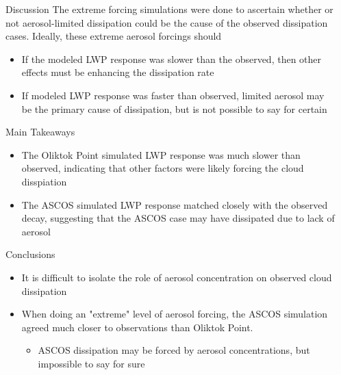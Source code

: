 \documentclass[final]{beamer}
\newlength{\sepwid}
\newlength{\onecolwid}
\begin{document}
\begin{frame}[t]
\begin{columns}[t]
\begin{column}{\sepwid}\end{column}

\begin{column}{\onecolwid}
	\begin{block}{Discussion}
		The extreme forcing simulations were done to ascertain whether or not aerosol-limited dissipation could be the cause of the observed dissipation cases. Ideally, these extreme aerosol forcings should

		\begin{itemize}
			\item If the modeled LWP response was slower than the observed, then other effects must be enhancing the dissipation rate
			\item If modeled LWP response was faster than observed, limited aerosol may be the primary cause of dissipation, but is not possible to say for certain
		\end{itemize}
		
	\end{block}
	\begin{alertblock}{Main Takeaways}
		\begin{itemize}
			\item The Oliktok Point simulated LWP response was much slower than observed, indicating that other factors were likely forcing the cloud disspiation	
			\item The ASCOS simulated LWP response matched closely with the observed decay, suggesting that the ASCOS case may have dissipated due to lack of aerosol
		\end{itemize}
	\end{alertblock}
	
	\begin{block}{Conclusions}
		\begin{itemize}
			\item It is difficult to isolate the role of aerosol concentration on observed cloud dissipation
			\item When doing an "extreme" level of aerosol forcing, the ASCOS simulation agreed much closer to observations than Oliktok Point.
			\begin{itemize}
				\item ASCOS dissipation may be forced by aerosol concentrations, but impossible to say for sure
			\end{itemize}
		\end{itemize}
		

\end{block}
\end{column}
\end{columns}
\end{frame}
\end{document}
